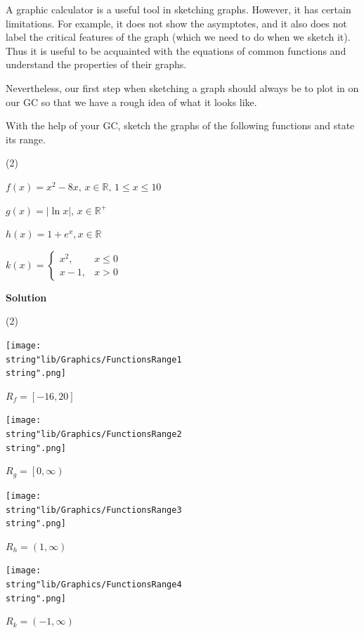 \documentclass[11pt,a4paper]{book}
\newcommand{\R}{\mathbb{R}}
\begin{document}
\medskip{}

A graphic calculator is a useful tool in sketching graphs. However,
it has certain limitations. For example, it does not show the asymptotes, and it also does not label the critical features of the graph (which we need to do when we sketch it). Thus it is useful to be acquainted with the equations of common functions and understand the properties of their graphs.

\medskip{}

Nevertheless, our first step when sketching a graph should always be to plot in on our GC so that we have a rough idea of what it looks like.

\newpage

\begin{example}{}

With the help of your GC, sketch the graphs of the following functions and state its range.

\begin{tasks}[label=(\alph*),label-width=3.5ex](2)

\task  $f\left(x\right)=x^{2}-8x,\,x\in\R,\,1\leq x\leq10$

\task  $g\left(x\right)=\left|\ln x\right|,\,x\in\R^{+}$

\task  $h\left(x\right)=1+e^{x},x\in\R$

\task  $k\left(x\right)=\begin{cases}
x^{2}, & x\leq0\\
x-1, & x>0
\end{cases}$

\end{tasks}

\textbf{Solution}

\begin{tasks}[label=(\alph*),label-width=3.5ex](2)

\task  \texttt{[image: \\string"lib/Graphics/FunctionsRange1\\string".png]}

$R_{f}=\left[-16,20\right]$

\task \texttt{[image: \\string"lib/Graphics/FunctionsRange2\\string".png]}

$R_{g}=\left[0,\infty\right)$

\task \texttt{[image: \\string"lib/Graphics/FunctionsRange3\\string".png]}

$R_{h}=\left(1,\infty\right)$

\task \texttt{[image: \\string"lib/Graphics/FunctionsRange4\\string".png]}

$R_{k}=\left(-1,\infty\right)$

\end{tasks}

\end{example}
\end{document}
